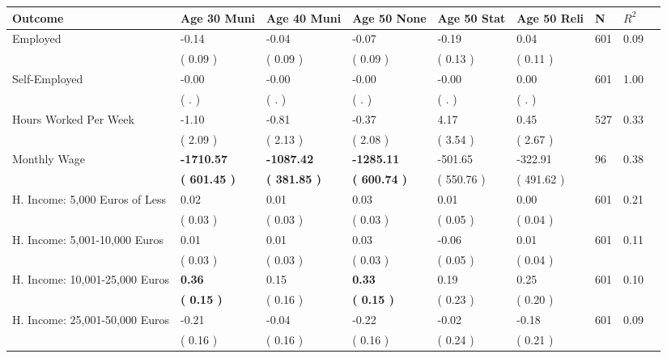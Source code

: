 \begin{tabular}{L{6.2cm} C{1.8cm} C{1.8cm} C{1.8cm} C{1.8cm} C{1.8cm} C{1.8cm} C{0.3cm} C{0.3cm}}
\toprule
 \textbf{Outcome} & \textbf{Age 30 Muni} & \textbf{Age 40 Muni} & \textbf{Age 50 None} & \textbf{Age 50 Stat} & \textbf{Age 50 Reli} & \textbf{N} & \textbf{$ R^2$} \\
\midrule
Employed &     -0.14 &     -0.04 &     -0.07 &     -0.19 &      0.04  & 601 &       0.09 \\ 
 & (     0.09 ) & (     0.09 ) & (     0.09 ) & (     0.13 ) & (     0.11 )  & \\
Self-Employed &     -0.00 &     -0.00 &     -0.00 &     -0.00 &      0.00  & 601 &       1.00 \\ 
 & (        . ) & (        . ) & (        . ) & (        . ) & (        . )  & \\
Hours Worked Per Week &     -1.10 &     -0.81 &     -0.37 &      4.17 &      0.45  & 527 &       0.33 \\ 
 & (     2.09 ) & (     2.13 ) & (     2.08 ) & (     3.54 ) & (     2.67 )  & \\
Monthly Wage & \textbf{ -1710.57} & \textbf{ -1087.42} & \textbf{ -1285.11} &   -501.65 &   -322.91  & 96 &       0.38 \\ 
 & \textbf{(   601.45 )} & \textbf{(   381.85 )} & \textbf{(   600.74 )} & (   550.76 ) & (   491.62 )  & \\
H. Income: 5,000 Euros of Less &      0.02 &      0.01 &      0.03 &      0.01 &      0.00  & 601 &       0.21 \\ 
 & (     0.03 ) & (     0.03 ) & (     0.03 ) & (     0.05 ) & (     0.04 )  & \\
H. Income: 5,001-10,000 Euros &      0.01 &      0.01 &      0.03 &     -0.06 &      0.01  & 601 &       0.11 \\ 
 & (     0.03 ) & (     0.03 ) & (     0.03 ) & (     0.05 ) & (     0.04 )  & \\
H. Income: 10,001-25,000 Euros & \textbf{     0.36} &      0.15 & \textbf{     0.33} &      0.19 &      0.25  & 601 &       0.10 \\ 
 & \textbf{(     0.15 )} & (     0.16 ) & \textbf{(     0.15 )} & (     0.23 ) & (     0.20 )  & \\
H. Income: 25,001-50,000 Euros &     -0.21 &     -0.04 &     -0.22 &     -0.02 &     -0.18  & 601 &       0.09 \\ 
 & (     0.16 ) & (     0.16 ) & (     0.16 ) & (     0.24 ) & (     0.21 )  & \\

\end{tabular}
